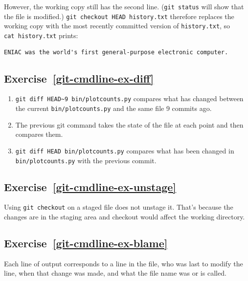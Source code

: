 \documentclass[
]{krantz}
\providecommand{\tightlist}{%
  \setlength{\itemsep}{0pt}\setlength{\parskip}{0pt}}
\begin{document}
However,
the working copy still has the second line.
(\texttt{git\ status} will show that the file is modified.)
\texttt{git\ checkout\ HEAD\ history.txt} therefore replaces the working copy with
the most recently committed version of \texttt{history.txt},
so \texttt{cat\ history.txt} prints:

\begin{verbatim}
ENIAC was the world's first general-purpose electronic computer.
\end{verbatim}

\hypertarget{exercise-refgit-cmdline-ex-diff}{%
\subsection*{Exercise~\ref{git-cmdline-ex-diff}}\label{exercise-refgit-cmdline-ex-diff}}


\begin{enumerate}
\def\labelenumi{\arabic{enumi}.}
\tightlist
\item
  \texttt{git\ diff\ HEAD\textasciitilde{}9\ bin/plotcounts.py} compares what has changed between the
  current \texttt{bin/plotcounts.py} and the same file 9 commits ago.
\item
  The previous git command takes the state of the file at each point and then
  compares them.
\item
  \texttt{git\ diff\ HEAD\ bin/plotcounts.py} compares what has been changed in
  \texttt{bin/plotcounts.py} with the previous commit.
\end{enumerate}

\hypertarget{exercise-refgit-cmdline-ex-unstage}{%
\subsection*{Exercise~\ref{git-cmdline-ex-unstage}}\label{exercise-refgit-cmdline-ex-unstage}}


Using \texttt{git\ checkout} on a staged file does not unstage it. That's
because the changes are in the staging area and checkout would affect
the working directory.

\hypertarget{exercise-refgit-cmdline-ex-blame}{%
\subsection*{Exercise~\ref{git-cmdline-ex-blame}}\label{exercise-refgit-cmdline-ex-blame}}


Each line of output corresponds to a line in the file, who was last
to modify the line, when that change was made, and what the file name was
or is called.
\end{document}
